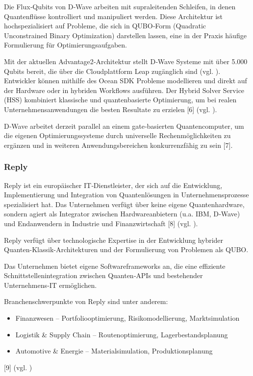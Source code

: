 Die Flux‑Qubits von D‑Wave arbeiten mit supraleitenden Schleifen, in denen Quantenflüsse kontrolliert und manipuliert werden.
Diese Architektur ist hochspezialisiert auf Probleme, die sich in QUBO‑Form (Quadratic Unconstrained Binary Optimization) darstellen lassen, eine in der Praxis häufige Formulierung für Optimierungsaufgaben.

Mit der aktuellen Advantage2‑Architektur stellt D‑Wave Systeme mit über 5.000 Qubits bereit, die über die Cloudplattform Leap zugänglich sind (vgl. \cite{noauthor_d-wave_nodate}).
Entwickler können mithilfe des Ocean SDK Probleme modellieren und direkt auf der Hardware oder in hybriden Workflows ausführen.
Der Hybrid Solver Service (HSS) kombiniert klassische und quantenbasierte Optimierung, um bei realen Unternehmensanwendungen die besten Resultate zu erzielen [6] (vgl. \cite{brandhofer_benchmarking_2022}).

D‑Wave arbeitet derzeit parallel an einem gate‑basierten Quantencomputer, um die eigenen Optimierungssysteme durch universelle Rechenmöglichkeiten zu ergänzen und in weiteren Anwendungsbereichen konkurrenzfähig zu sein [7].

\subsubsection*{Reply}
Reply ist ein europäischer IT‑Dienstleister, der sich auf die Entwicklung, Implementierung und Integration von Quantenlösungen in Unternehmensprozesse spezialisiert hat.
Das Unternehmen verfügt über keine eigene Quantenhardware, sondern agiert als Integrator zwischen Hardwareanbietern (u.a. IBM, D‑Wave) und Endanwendern in Industrie und Finanzwirtschaft [8] (vgl. \cite{brandhofer_benchmarking_2022}).

Reply verfügt über technologische Expertise in der Entwicklung hybrider Quanten-Klassik-Architekturen und der Formulierung von Problemen als QUBO.

Das Unternehmen bietet eigene Softwareframeworks an, die eine effiziente Schnittstellenintegration zwischen Quanten‑APIs und bestehender Unternehmens‑IT ermöglichen.

Branchenschwerpunkte von Reply sind unter anderem:

\begin{itemize}
\item Finanzwesen – Portfoliooptimierung, Risikomodellierung, Marktsimulation
\item Logistik \& Supply Chain – Routenoptimierung, Lagerbestandsplanung
\item Automotive \& Energie – Materialsimulation, Produktionsplanung
\end{itemize}
[9] (vgl. \cite{brandhofer_benchmarking_2022})

